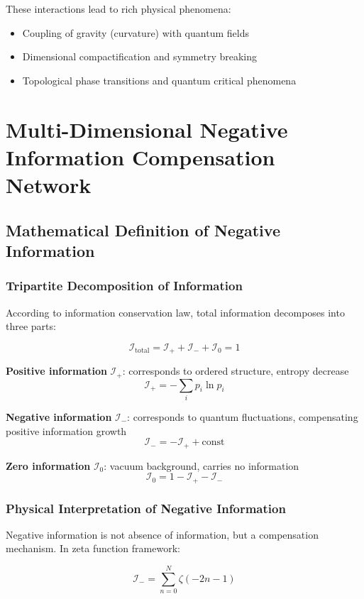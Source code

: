 \documentclass[12pt,a4paper]{article}
\begin{document}
These interactions lead to rich physical phenomena:
\begin{itemize}
\item Coupling of gravity (curvature) with quantum fields
\item Dimensional compactification and symmetry breaking
\item Topological phase transitions and quantum critical phenomena
\end{itemize}

\section{Multi-Dimensional Negative Information Compensation Network}

\subsection{Mathematical Definition of Negative Information}

\subsubsection{Tripartite Decomposition of Information}

According to information conservation law, total information decomposes into three parts:

$$\mathcal{I}_{\text{total}} = \mathcal{I}_+ + \mathcal{I}_- + \mathcal{I}_0 = 1$$

\textbf{Positive information} $\mathcal{I}_+$: corresponds to ordered structure, entropy decrease
$$\mathcal{I}_+ = -\sum_i p_i \ln p_i$$

\textbf{Negative information} $\mathcal{I}_-$: corresponds to quantum fluctuations, compensating positive information growth
$$\mathcal{I}_- = -\mathcal{I}_+ + \text{const}$$

\textbf{Zero information} $\mathcal{I}_0$: vacuum background, carries no information
$$\mathcal{I}_0 = 1 - \mathcal{I}_+ - \mathcal{I}_-$$

\subsubsection{Physical Interpretation of Negative Information}

Negative information is not absence of information, but a compensation mechanism. In zeta function framework:

$$\mathcal{I}_- = \sum_{n=0}^{N} \zeta(-2n-1)$$
\end{document}
